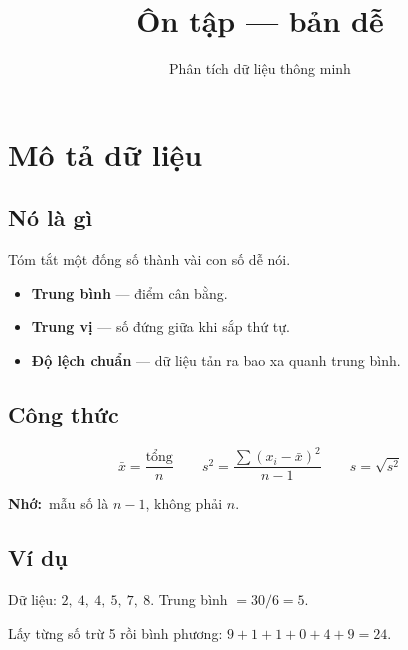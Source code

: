 \documentclass[12pt]{article}
\title{\vspace{-1.5cm}\bfseries Ôn tập — bản dễ}
\author{Phân tích dữ liệu thông minh}
\date{}
\newcommand{\nho}{\textbf{Nhớ:}\ }
\begin{document}
\maketitle
\vspace{-0.8cm}

\begin{center}
\end{center}

\tableofcontents
\newpage

\section{Mô tả dữ liệu}

\subsection*{Nó là gì}

Tóm tắt một đống số thành vài con số dễ nói.

\begin{itemize}
\item \textbf{Trung bình} --- điểm cân bằng.
\item \textbf{Trung vị} --- số đứng giữa khi sắp thứ tự.
\item \textbf{Độ lệch chuẩn} --- dữ liệu tản ra bao xa quanh trung bình.
\end{itemize}

\subsection*{Công thức}

\[
\bar{x} = \frac{\text{tổng}}{n}
\qquad
s^2 = \frac{\sum (x_i-\bar{x})^2}{n-1}
\qquad
s = \sqrt{s^2}
\]

\nho mẫu số là $n-1$, không phải $n$.

\subsection*{Ví dụ}

Dữ liệu: $2,\ 4,\ 4,\ 5,\ 7,\ 8$. Trung bình $= 30/6 = 5$.

Lấy từng số trừ 5 rồi bình phương:
$9 + 1 + 1 + 0 + 4 + 9 = 24$.
\end{document}
